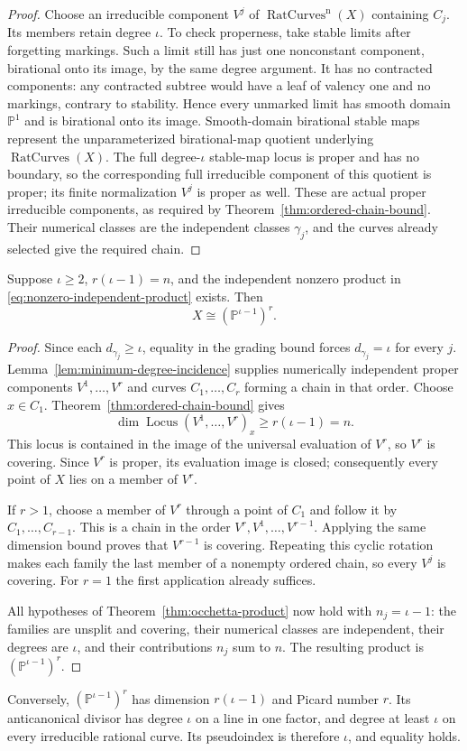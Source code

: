\begin{proof}
Choose an irreducible component $V^j$ of
$\operatorname{RatCurves}^{\mathrm n}(X)$ containing $C_j$.
Its members retain degree $\iota$.  To check properness, take stable
limits after forgetting markings.  Such a limit still has just one
nonconstant component, birational onto its image, by the same
degree argument.  It has no contracted components: any contracted
subtree would have a leaf of valency one and no markings, contrary
to stability.  Hence every unmarked limit has smooth domain
$\mathbb P^1$ and is birational onto its image.  Smooth-domain
birational stable maps represent the unparameterized birational-map
quotient underlying $\operatorname{RatCurves}(X)$.  The full
degree-$\iota$ stable-map locus is proper and has no boundary, so the
corresponding full irreducible component of this quotient is proper;
its finite normalization $V^j$ is proper as well.
These are actual proper irreducible components, as required by
Theorem~\ref{thm:ordered-chain-bound}.  Their numerical classes are
the independent classes $\gamma_j$, and the curves already selected
give the required chain.
\end{proof}

\begin{proposition}
\label{prop:equality-rigidity}
Suppose $\iota\ge2$, $r(\iota-1)=n$, and the independent nonzero
product in \eqref{eq:nonzero-independent-product} exists.  Then
\[
 X\cong(\mathbb P^{\iota-1})^r.
\]
\end{proposition}

\begin{proof}
Since each $d_{\gamma_j}\ge\iota$, equality in the grading bound
forces $d_{\gamma_j}=\iota$ for every $j$.
Lemma~\ref{lem:minimum-degree-incidence} supplies numerically
independent proper components $V^1,\ldots,V^r$ and curves
$C_1,\ldots,C_r$ forming a chain in that order.  Choose $x\in C_1$.
Theorem~\ref{thm:ordered-chain-bound} gives
\[
 \dim\operatorname{Locus}(V^1,\ldots,V^r)_x
 \ge r(\iota-1)=n.
\]
This locus is contained in the image of the universal evaluation of
$V^r$, so $V^r$ is covering.  Since $V^r$ is proper, its evaluation
image is closed; consequently every point of $X$ lies on a member
of $V^r$.

If $r>1$, choose a member of $V^r$ through a point of $C_1$ and
follow it by $C_1,\ldots,C_{r-1}$.  This is a chain in the order
$V^r,V^1,\ldots,V^{r-1}$.  Applying the same dimension bound proves
that $V^{r-1}$ is covering.  Repeating this cyclic rotation makes
each family the last member of a nonempty ordered chain, so every
$V^j$ is covering.  For $r=1$ the first application already suffices.

All hypotheses of Theorem~\ref{thm:occhetta-product} now hold with
$n_j=\iota-1$: the families are unsplit and covering, their
numerical classes are independent, their degrees are $\iota$, and
their contributions $n_j$ sum to $n$.  The resulting product is
$(\mathbb P^{\iota-1})^r$.
\end{proof}

Conversely, $(\mathbb P^{\iota-1})^r$ has dimension $r(\iota-1)$
and Picard number $r$.  Its anticanonical divisor has degree $\iota$
on a line in one factor, and degree at least $\iota$ on every
irreducible rational curve.  Its pseudoindex is therefore $\iota$,
and equality holds.
